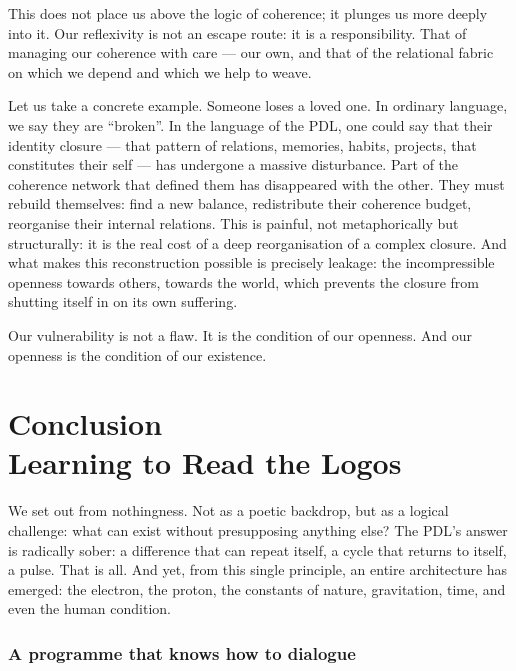 \documentclass[12pt, a4paper, openright]{book}
\begin{document}
\medskip

This does not place us above the logic of coherence; it plunges us more deeply into it. Our reflexivity is not an escape route: it is a responsibility. That of managing our coherence with care — our own, and that of the relational fabric on which we depend and which we help to weave.

\medskip

Let us take a concrete example. Someone loses a loved one. In ordinary language, we say they are “broken”. In the language of the PDL, one could say that their identity closure — that pattern of relations, memories, habits, projects, that constitutes their self — has undergone a massive disturbance. Part of the coherence network that defined them has disappeared with the other. They must rebuild themselves: find a new balance, redistribute their coherence budget, reorganise their internal relations. This is painful, not metaphorically but structurally: it is the real cost of a deep reorganisation of a complex closure. And what makes this reconstruction possible is precisely leakage: the incompressible openness towards others, towards the world, which prevents the closure from shutting itself in on its own suffering.

\medskip

Our vulnerability is not a flaw. It is the condition of our openness. And our openness is the condition of our existence.

\chapter[Conclusion --- Learning to Read the Logos]{Conclusion \\ Learning to Read the Logos}

We set out from nothingness. Not as a poetic backdrop, but as a logical challenge: what can exist without presupposing anything else? The PDL's answer is radically sober: a difference that can repeat itself, a cycle that returns to itself, a pulse. That is all. And yet, from this single principle, an entire architecture has emerged: the electron, the proton, the constants of nature, gravitation, time, and even the human condition.

\subsection*{A programme that knows how to dialogue}
\end{document}
